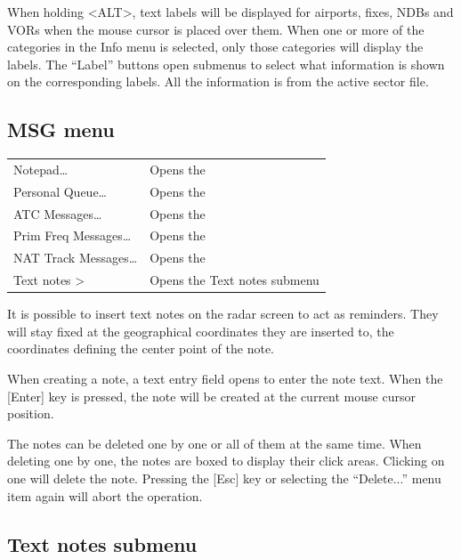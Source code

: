 \documentclass[a4paper,oneside,11pt]{memoir}
\newcommand{\winref}[1]{\textit{\titleref{#1}}}
\begin{document}
\bigskip

When holding <ALT>, text labels will be displayed for airports, fixes, NDBs and VORs when the mouse cursor is placed over them. When one or more of the categories in the Info menu is selected, only those categories will display the labels. The “Label” buttons open submenus to select what information is shown on the corresponding labels. All the information is from the active sector file.

\subsection{MSG menu}
\label{menu:msg}

\begin{longtable}{p{5cm} p{7.5cm}}
  Notepad…              & Opens the \winref{win:note}\\
  Personal Queue…       & Opens the \winref{win:pqw}\\
  ATC Messages…         & Opens the \winref{win:atcmw}\\
  Prim Freq Messages…   & Opens the \winref{win:pfmw}\\
  NAT Track Messages…   & Opens the \winref{win:nattmw}\\
  Text notes >          & Opens the Text notes submenu\\
\end{longtable}

\bigskip

It is possible to insert text notes on the radar screen to act as reminders. They will stay fixed at the geographical coordinates they are inserted to, the coordinates defining the center point of the note.

\bigskip

When creating a note, a text entry field opens to enter the note text. When the [Enter] key is pressed, the note will be created at the current mouse cursor position.

\bigskip

The notes can be deleted one by one or all of them at the same time. When deleting one by one, the notes are boxed to display their click areas. Clicking on one will delete the note. Pressing the [Esc] key or selecting the “Delete...” menu item again will abort the operation.

\subsection*{Text notes submenu}
\label{menu:tnm}
\end{document}

